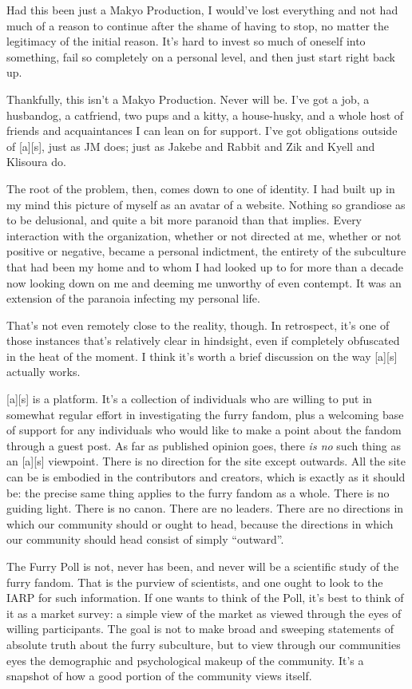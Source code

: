 Had this been just a Makyo Production, I would've lost everything and
not had much of a reason to continue after the shame of having to stop,
no matter the legitimacy of the initial reason. It's hard to invest so
much of oneself into something, fail so completely on a personal level,
and then just start right back up.

Thankfully, this isn't a Makyo Production. Never will be. I've got a
job, a husbandog, a catfriend, two pups and a kitty, a house-husky, and
a whole host of friends and acquaintances I can lean on for support.
I've got obligations outside of {[}a{]}{[}s{]}, just as JM does; just as
Jakebe and Rabbit and Zik and Kyell and Klisoura do.

The root of the problem, then, comes down to one of identity. I had
built up in my mind this picture of myself as an avatar of a website.
Nothing so grandiose as to be delusional, and quite a bit more paranoid
than that implies. Every interaction with the organization, whether or
not directed at me, whether or not positive or negative, became a
personal indictment, the entirety of the subculture that had been my
home and to whom I had looked up to for more than a decade now looking
down on me and deeming me unworthy of even contempt. It was an extension
of the paranoia infecting my personal life.

That's not even remotely close to the reality, though. In retrospect,
it's one of those instances that's relatively clear in hindsight, even
if completely obfuscated in the heat of the moment. I think it's worth a
brief discussion on the way {[}a{]}{[}s{]} actually works.

{[}a{]}{[}s{]} is a platform. It's a collection of individuals who are
willing to put in somewhat regular effort in investigating the furry
fandom, plus a welcoming base of support for any individuals who would
like to make a point about the fandom through a guest post. As far as
published opinion goes, there \emph{is no} such thing as an
{[}a{]}{[}s{]} viewpoint. There is no direction for the site except
outwards. All the site can be is embodied in the contributors and
creators, which is exactly as it should be: the precise same thing
applies to the furry fandom as a whole. There is no guiding light. There
is no canon. There are no leaders. There are no directions in which our
community should or ought to head, because the directions in which our
community should head consist of simply ``outward''.

The Furry Poll is not, never has been, and never will be a scientific
study of the furry fandom. That is the purview of scientists, and one
ought to look to the IARP for such information. If one wants to think of
the Poll, it's best to think of it as a market survey: a simple view of
the market as viewed through the eyes of willing participants. The goal
is not to make broad and sweeping statements of absolute truth about the
furry subculture, but to view through our communities eyes the
demographic and psychological makeup of the community. It's a snapshot
of how a good portion of the community views itself.

